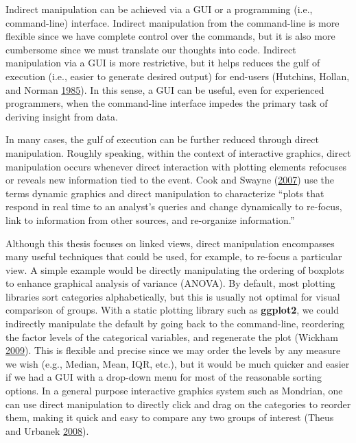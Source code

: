 \documentclass[12pt,]{isuthesis}
\begin{document}
Indirect manipulation can be achieved via a GUI or a programming (i.e.,
command-line) interface. Indirect manipulation from the command-line is
more flexible since we have complete control over the commands, but it
is also more cumbersome since we must translate our thoughts into code.
Indirect manipulation via a GUI is more restrictive, but it helps
reduces the gulf of execution (i.e., easier to generate desired output)
for end-users (Hutchins, Hollan, and Norman
\protect\hyperlink{ref-Hutchins:1985wu}{1985}). In this sense, a GUI can
be useful, even for experienced programmers, when the command-line
interface impedes the primary task of deriving insight from data.

In many cases, the gulf of execution can be further reduced through
direct manipulation. Roughly speaking, within the context of interactive
graphics, direct manipulation occurs whenever direct interaction with
plotting elements refocuses or reveals new information tied to the
event. Cook and Swayne (\protect\hyperlink{ref-ggobi:2007}{2007}) use
the terms dynamic graphics and direct manipulation to characterize
``plots that respond in real time to an analyst's queries and change
dynamically to re-focus, link to information from other sources, and
re-organize information.''

Although this thesis focuses on linked views, direct manipulation
encompasses many useful techniques that could be used, for example, to
re-focus a particular view. A simple example would be directly
manipulating the ordering of boxplots to enhance graphical analysis of
variance (ANOVA). By default, most plotting libraries sort categories
alphabetically, but this is usually not optimal for visual comparison of
groups. With a static plotting library such as \textbf{ggplot2}, we
could indirectly manipulate the default by going back to the
command-line, reordering the factor levels of the categorical variables,
and regenerate the plot (Wickham \protect\hyperlink{ref-ggplot2}{2009}).
This is flexible and precise since we may order the levels by any
measure we wish (e.g., Median, Mean, IQR, etc.), but it would be much
quicker and easier if we had a GUI with a drop-down menu for most of the
reasonable sorting options. In a general purpose interactive graphics
system such as Mondrian, one can use direct manipulation to directly
click and drag on the categories to reorder them, making it quick and
easy to compare any two groups of interest (Theus and Urbanek
\protect\hyperlink{ref-mondrianbook}{2008}).
\end{document}
